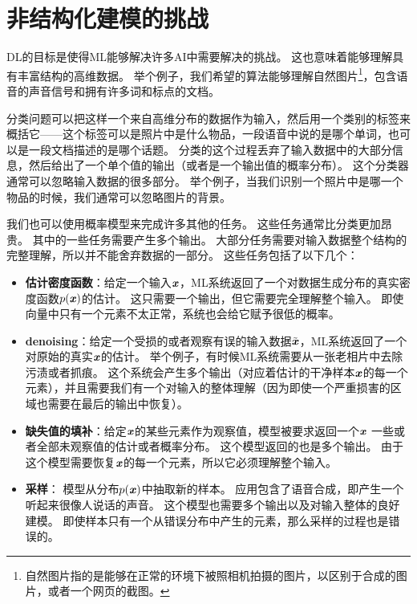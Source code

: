 \section{非结构化建模的挑战}
\label{sec:the_challenge_of_unstructured_modelling}


\gls{DL}的目标是使得\gls{ML}能够解决许多\gls{AI}中需要解决的挑战。
这也意味着能够理解具有丰富结构的高维数据。
举个例子，我们希望的算法能够理解自然图片\footnote{自然图片指的是能够在正常的环境下被照相机拍摄的图片，以区别于合成的图片，或者一个网页的截图。}，包含语音的声音信号和拥有许多词和标点的文档。


分类问题可以把这样一个来自高维分布的数据作为输入，然后用一个类别的标签来概括它——这个标签可以是照片中是什么物品，一段语音中说的是哪个单词，也可以是一段文档描述的是哪个话题。
分类的这个过程丢弃了输入数据中的大部分信息，然后给出了一个单个值的输出（或者是一个输出值的概率分布）。
这个分类器通常可以忽略输入数据的很多部分。
举个例子，当我们识别一个照片中是哪一个物品的时候，我们通常可以忽略图片的背景。


我们也可以使用概率模型来完成许多其他的任务。
这些任务通常比分类更加昂贵。
其中的一些任务需要产生多个输出。
大部分任务需要对输入数据整个结构的完整理解，所以并不能舍弃数据的一部分。
这些任务包括了以下几个：
\begin{itemize}
\item \textbf{估计密度函数}：给定一个输入$\boldsymbol{\mathit{x}}$，\gls{ML}系统返回了一个对数据生成分布的真实密度函数$p(\boldsymbol{\mathit{x}})$的估计。
这只需要一个输出，但它需要完全理解整个输入。
即使向量中只有一个元素不太正常，系统也会给它赋予很低的概率。
	
	
\item
\textbf{\gls{denoising}}：给定一个受损的或者观察有误的输入数据$\tilde{\boldsymbol{\mathit{x}}}$，\gls{ML}系统返回了一个对原始的真实$\boldsymbol{\mathit{x}}$的估计。
举个例子，有时候\gls{ML}系统需要从一张老相片中去除污渍或者抓痕。
这个系统会产生多个输出（对应着估计的干净样本$\boldsymbol{\mathit{x}}$的每一个元素），并且需要我们有一个对输入的整体理解（因为即使一个严重损害的区域也需要在最后的输出中恢复）。
	
\item
\textbf{缺失值的填补}：给定$\boldsymbol{\mathit{x}}$的某些元素作为观察值，模型被要求返回一个$\boldsymbol{\mathit{x}}$
一些或者全部未观察值的估计或者概率分布。
这个模型返回的也是多个输出。
由于这个模型需要恢复$\boldsymbol{\mathit{x}}$的每一个元素，所以它必须理解整个输入。
	
	
\item \textbf{采样}： 模型从分布$p(\boldsymbol{\mathit{x}})$中抽取新的样本。
应用包含了语音合成，即产生一个听起来很像人说话的声音。
这个模型也需要多个输出以及对输入整体的良好建模。
即使样本只有一个从错误分布中产生的元素，那么采样的过程也是错误的。 
\end{itemize}

